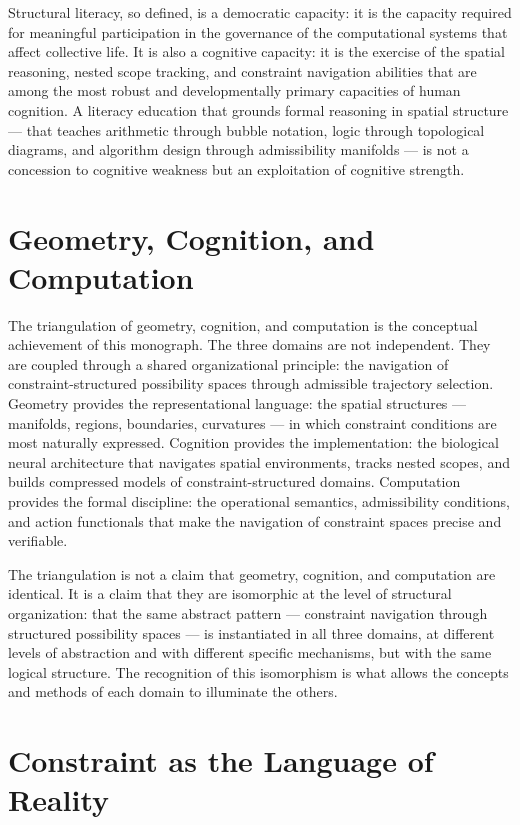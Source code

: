 \documentclass[12pt,openany]{book}
\theoremstyle{plain}
\theoremstyle{definition}
\theoremstyle{remark}
\begin{document}
Structural literacy, so defined, is a democratic capacity: it is the capacity required for meaningful participation in the governance of the computational systems that affect collective life. It is also a cognitive capacity: it is the exercise of the spatial reasoning, nested scope tracking, and constraint navigation abilities that are among the most robust and developmentally primary capacities of human cognition. A literacy education that grounds formal reasoning in spatial structure — that teaches arithmetic through bubble notation, logic through topological diagrams, and algorithm design through admissibility manifolds — is not a concession to cognitive weakness but an exploitation of cognitive strength.

\section*{Geometry, Cognition, and Computation}

The triangulation of geometry, cognition, and computation is the conceptual achievement of this monograph. The three domains are not independent. They are coupled through a shared organizational principle: the navigation of constraint-structured possibility spaces through admissible trajectory selection. Geometry provides the representational language: the spatial structures — manifolds, regions, boundaries, curvatures — in which constraint conditions are most naturally expressed. Cognition provides the implementation: the biological neural architecture that navigates spatial environments, tracks nested scopes, and builds compressed models of constraint-structured domains. Computation provides the formal discipline: the operational semantics, admissibility conditions, and action functionals that make the navigation of constraint spaces precise and verifiable.

The triangulation is not a claim that geometry, cognition, and computation are identical. It is a claim that they are isomorphic at the level of structural organization: that the same abstract pattern — constraint navigation through structured possibility spaces — is instantiated in all three domains, at different levels of abstraction and with different specific mechanisms, but with the same logical structure. The recognition of this isomorphism is what allows the concepts and methods of each domain to illuminate the others.

\section*{Constraint as the Language of Reality}
\end{document}
